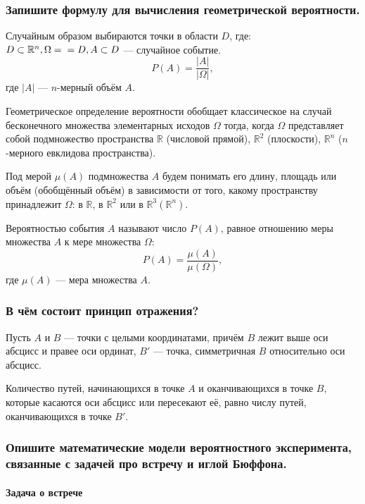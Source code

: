 \documentclass{book}
\begin{document}
\subsubsection*{Запишите формулу для вычисления геометрической вероятности.}

Случайным образом выбираются точки в области $D$, где:
$D \subset \mathbb{R}^n,
\Omega = \\
= D,
A \subset D$
--- случайное событие.
$$P \left( A \right) =
\frac{|A|}{| \Omega |}, $$
где $|A|$ --- $n$-мерный объём $A$.

Геометрическое определение вероятности обобщает классическое на случай бесконечного множества элементарных исходов
$ \Omega $ тогда, когда $ \Omega $ представляет собой подмножество пространства $ \mathbb{R}$ (числовой прямой),
$ \mathbb{R}^2$ (плоскости), $ \mathbb{R}^n$ ($n$-мерного евклидова пространства).

Под мерой $ \mu \left( A \right) $ подмножества $A$ будем понимать его длину,
площадь или объём (обобщённый объём) в зависимости от того,
какому пространству принадлежит $ \Omega $:
в  $ \mathbb{R}$, в $ \mathbb{R}^2$ или в $ \mathbb{R}^3 \left(  \mathbb{R}^n \right) $.

Вероятностью события $A$
называют число $P \left( A \right) $, равное отношению меры множества $A$ к мере множества $ \Omega $:
$$P \left( A \right) =
\frac{ \mu \left( A \right) }{ \mu \left( \Omega \right) },$$
где $ \mu \left( A \right) $ --- мера множества $A$.

\subsubsection*{В чём состоит принцип отражения?}

Пусть $A$ и $B$ --- точки с целыми координатами, причём $B$ лежит выше оси абсцисс и правее оси ординат, $B'$ --- точка, симметричная $B$ относительно оси абсцисс.

Количество путей, начинающихся в точке $A$ и оканчивающихся в точке $B$, которые касаются оси абсцисс или пересекают её, равно числу путей, оканчивающихся в точке $B'$.

\subsubsection*{Опишите математические модели вероятностного эксперимента, связанные с задачей про встречу и иглой Бюффона.}

\paragraph*{Задача о встрече}
\end{document}
